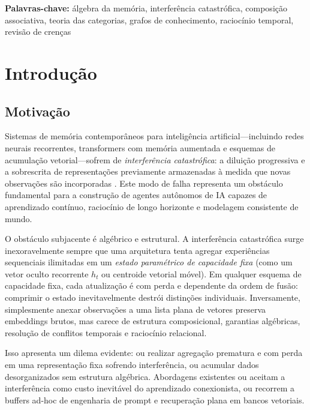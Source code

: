 \documentclass[11pt,a4paper]{article}
\theoremstyle{definition}
\begin{document}
\begin{abstract}
\url{https://github.com/pedrofariasx/memory-algebra} (DOI: \href{https://doi.org/10.5281/zenodo.22815162}{10.5281/zenodo.22815162}).
\end{abstract}

\textbf{Palavras-chave:} \'algebra da mem\'oria, interfer\^encia catastr\'ofica, composi\c{c}\~ao associativa, teoria das categorias, grafos de conhecimento, racioc\'inio temporal, revis\~ao de cren\c{c}as

\section{Introdu\c{c}\~ao}

\subsection{Motiva\c{c}\~ao}

Sistemas de mem\'oria contempor\^aneos para intelig\^encia artificial---incluindo redes neurais recorrentes, transformers com mem\'oria aumentada e esquemas de acumula\c{c}\~ao vetorial---sofrem de \emph{interfer\^encia catastr\'ofica}: a dilui\c{c}\~ao progressiva e a sobrescrita de representa\c{c}\~oes previamente armazenadas \`a medida que novas observa\c{c}\~oes s\~ao incorporadas \cite{mccloskey1989catastrophic,french1999catastrophic}. Este modo de falha representa um obst\'aculo fundamental para a constru\c{c}\~ao de agentes aut\^onomos de IA capazes de aprendizado cont\'inuo, racioc\'inio de longo horizonte e modelagem consistente de mundo.

O obst\'aculo subjacente \'e alg\'ebrico e estrutural. A interfer\^encia catastr\'ofica surge inexoravelmente sempre que uma arquitetura tenta agregar experi\^encias sequenciais ilimitadas em um \emph{estado param\'etrico de capacidade fixa} (como um vetor oculto recorrente $h_t$ ou centroide vetorial m\'ovel). Em qualquer esquema de capacidade fixa, cada atualiza\c{c}\~ao \'e com perda e dependente da ordem de fus\~ao: comprimir o estado inevitavelmente destr\'oi distin\c{c}\~oes individuais. Inversamente, simplesmente anexar observa\c{c}\~oes a uma lista plana de vetores preserva embeddings brutos, mas carece de estrutura composicional, garantias alg\'ebricas, resolu\c{c}\~ao de conflitos temporais e racioc\'inio relacional.

Isso apresenta um dilema evidente: ou realizar agrega\c{c}\~ao prematura e com perda em uma representa\c{c}\~ao fixa sofrendo interfer\^encia, ou acumular dados desorganizados sem estrutura alg\'ebrica. Abordagens existentes ou aceitam a interfer\^encia como custo inevit\'avel do aprendizado conexionista, ou recorrem a buffers ad-hoc de engenharia de prompt e recupera\c{c}\~ao plana em bancos vetoriais.
\end{document}
